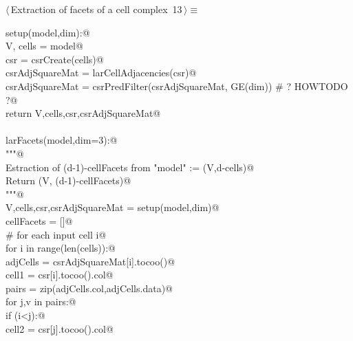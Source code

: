 \documentclass[11pt,oneside]{article}	%
\begin{document}
\begin{flushleft} \small
\begin{minipage}{\linewidth} \label{scrap26}
\protect{}$\langle\,$Extraction of facets of a cell complex\nobreak\ {\footnotesize 13}$\,\rangle\equiv$
\vspace{-1ex}
\begin{list}{}{} \item
\mbox{}\verb@def setup(model,dim):@\\
\mbox{}\verb@    V, cells = model@\\
\mbox{}\verb@    csr = csrCreate(cells)@\\
\mbox{}\verb@    csrAdjSquareMat = larCellAdjacencies(csr)@\\
\mbox{}\verb@    csrAdjSquareMat = csrPredFilter(csrAdjSquareMat, GE(dim)) # ? HOWTODO ?@\\
\mbox{}\verb@    return V,cells,csr,csrAdjSquareMat@\\
\mbox{}\verb@@\\
\mbox{}\verb@def larFacets(model,dim=3):@\\
\mbox{}\verb@    """@\\
\mbox{}\verb@        Estraction of (d-1)-cellFacets from "model" := (V,d-cells)@\\
\mbox{}\verb@        Return (V, (d-1)-cellFacets)@\\
\mbox{}\verb@      """@\\
\mbox{}\verb@    V,cells,csr,csrAdjSquareMat = setup(model,dim)@\\
\mbox{}\verb@    cellFacets = []@\\
\mbox{}\verb@    # for each input cell i@\\
\mbox{}\verb@    for i in range(len(cells)):@\\
\mbox{}\verb@        adjCells = csrAdjSquareMat[i].tocoo()@\\
\mbox{}\verb@        cell1 = csr[i].tocoo().col@\\
\mbox{}\verb@        pairs = zip(adjCells.col,adjCells.data)@\\
\mbox{}\verb@        for j,v in pairs:@\\
\mbox{}\verb@            if (i<j):@\\
\mbox{}\verb@                cell2 = csr[j].tocoo().col@\\

\end{list}
\end{minipage}
\end{flushleft}
\end{document}
